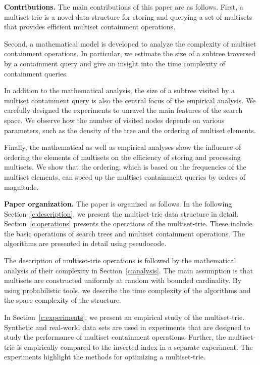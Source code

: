 \documentclass[algorithms,article,accept,pdftex,moreauthors]{Definitions/mdpi}
\begin{document}
\medskip\noindent\textbf{Contributions.}\;
The main contributions of this paper are as follows. First, a  multiset-trie is a novel data structure for storing and querying a set of multisets that provides efficient multiset containment operations. 

Second, a mathematical model is developed to analyze the complexity of multiset containment operations. In particular, we estimate the size of a subtree traversed by a containment query and give an insight into the time complexity of containment queries. 

In addition to the mathematical analysis, the size of a subtree visited by a multiset containment query is also the central focus of the empirical analysis. We carefully designed the experiments to unravel the main features of the search space. We observe how the number of visited nodes depends on various parameters, such as the density of the tree and the ordering of multiset elements.

Finally, the mathematical as well as empirical analyses show the influence of ordering the elements of multisets on the efficiency of storing and processing multisets. We show that the ordering, which is based on the frequencies of the multiset elements, can speed up the multiset containment queries by orders of magnitude.

\medskip\noindent\textbf{Paper organization.}\; 
The paper is organized as follows. In the following Section~\ref{c:description}, we present the multiset-trie data structure in detail.
Section~\ref{c:operations} presents the operations of the multiset-trie. These include the basic operations of search trees and multiset containment operations. The algorithms are presented in detail using pseudocode. 

The description of multiset-trie operations is followed by the mathematical analysis of their complexity in Section~\ref{c:analysis}. The main assumption is that multisets are constructed uniformly at random with bounded cardinality. By using probabilistic tools, we describe the time complexity of the algorithms and the space complexity of the structure.

In Section~\ref{c:experiments}, we present an empirical study of the multiset-trie. Synthetic and real-world data sets are used in experiments that are designed to study the performance of multiset containment operations. Further, the multiset-trie is empirically compared to the inverted index in a separate experiment. The experiments highlight the methods for optimizing a multiset-trie. 
\end{document}
